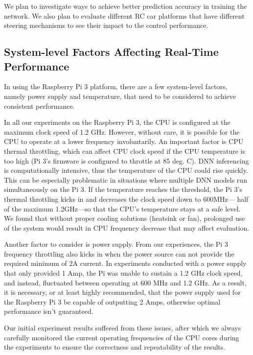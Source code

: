 
We plan to investigate ways to achieve better prediction accuracy
in training the network. We also plan to evaluate different RC
car platforms that have different steering mechanisms to see their
impact to the control performance.

\subsection{System-level Factors Affecting Real-Time Performance}
In using the Raspberry Pi 3 platform, there are a
few system-level factors, namely power supply and temperature, that
need to be considered to achieve consistent performance. 

In all our experiments on the Raspberry Pi 3, the CPU  is configured
at the maximum clock speed of 1.2 GHz. However, without care, it is
possible for the CPU to operate at a lower frequency involuntarily. 
An important factor is CPU thermal throttling, which can affect CPU
clock speed if the CPU temperature is too high (Pi 3's firmware is
configured to throttle at 85 deg. C).
DNN inferencing is computationally intensive, thus the temperature of
the CPU could rise quickly. This can be especially problematic in
situations where multiple DNN models run simultaneously on the
Pi 3. If the temperature reaches the threshold, the Pi 3's thermal
throttling kicks in and decreases the clock speed down to 600MHz---
half of the maximum 1.2GHz---so that the CPU's temperature stays at a
safe level.
We found that without proper cooling solutions (heatsink or fan), 
prolonged use of the system would result in CPU frequency decrease
that may affect evaluation.

Another factor to consider is power supply. From our experiences, the
Pi 3 frequency throttling also kicks in when the power source can not
provide the required minimum of 2A current.
In experiments conducted with a power supply that only provided 1 Amp,
the Pi was unable to sustain a 1.2 GHz clock speed, and instead,
fluctuated between operating at 600 MHz and 1.2 GHz. As a result, it
is necessary, or at least highly recommended, that the power supply
used for the Raspberry Pi 3 be capable of outputting 2 Amps, otherwise
optimal performance isn't guaranteed.

Our initial experiment results suffered from these issues, after which
we always carefully monitored the current operating frequencies of the
CPU cores during the experiments to ensure the correctness and
repeatability of the results.
